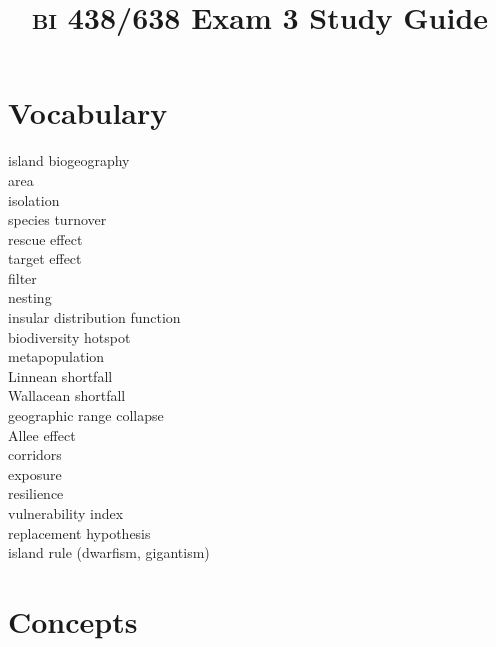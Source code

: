 \documentclass[letterpaper]{tufte-handout}
\title{{\scshape bi} 438/638 Exam 3 Study Guide}
\date{} %
\begin{document}
\maketitle	%

\section*{Vocabulary}

\vspace{-1\baselineskip}
\begin{multicols}{2}
\noindent island biogeography \\
area \\
isolation \\
species turnover \\
rescue effect \\
target effect \\
filter \\
nesting \\
insular distribution function \\
biodiversity hotspot \\
metapopulation \\
Linnean shortfall \\
Wallacean shortfall \\
geographic range collapse \\
Allee effect \\
corridors \\
exposure \\
resilience \\
vulnerability index \\
replacement hypothesis \\
island rule (dwarfism, gigantism) 
\end{multicols}

\section*{Concepts}
\end{document}
